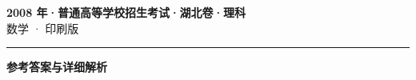\documentclass[zihao=5, a4paper]{ctexart}
\begin{document}
\begin{center}
  {\Large\bfseries 2008 年·普通高等学校招生考试·湖北卷·理科}\\[4pt]
  {\large 数学 · 印刷版}
\end{center}
\medskip
{}

\par\bigskip\hrule\bigskip
{}
\begin{center}{\large\bfseries 参考答案与详细解析}\end{center}
\smallskip

\end{document}
